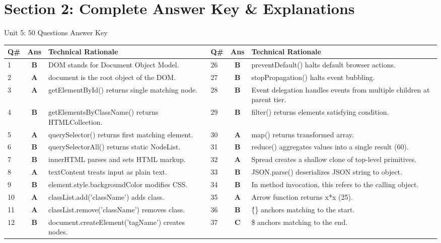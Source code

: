 \newpage
\section{Section 2: Complete Answer Key \& Explanations}

\begin{answerkeytable}{Unit 5: 50 Questions Answer Key}
\begin{tabularx}{\textwidth}{l c X l c X}
\toprule
\textbf{Q\#} & \textbf{Ans} & \textbf{Technical Rationale} & \textbf{Q\#} & \textbf{Ans} & \textbf{Technical Rationale} \\
\midrule
1 & \textbf{B} & DOM stands for Document Object Model. & 26 & \textbf{B} & preventDefault() halts default browser actions. \\
2 & \textbf{A} & document is the root object of the DOM. & 27 & \textbf{B} & stopPropagation() halts event bubbling. \\
3 & \textbf{A} & getElementById() returns single matching node. & 28 & \textbf{B} & Event delegation handles events from multiple children at parent tier. \\
4 & \textbf{B} & getElementsByClassName() returns HTMLCollection. & 29 & \textbf{B} & filter() returns elements satisfying condition. \\
5 & \textbf{A} & querySelector() returns first matching element. & 30 & \textbf{A} & map() returns transformed array. \\
6 & \textbf{B} & querySelectorAll() returns static NodeList. & 31 & \textbf{B} & reduce() aggregates values into a single result (60). \\
7 & \textbf{B} & innerHTML parses and sets HTML markup. & 32 & \textbf{A} & Spread creates a shallow clone of top-level primitives. \\
8 & \textbf{A} & textContent treats input as plain text. & 33 & \textbf{B} & JSON.parse() deserializes JSON string to object. \\
9 & \textbf{B} & element.style.backgroundColor modifies CSS. & 34 & \textbf{B} & In method invocation, this refers to the calling object. \\
10 & \textbf{A} & classList.add('className') adds class. & 35 & \textbf{A} & Arrow function returns x*x (25). \\
11 & \textbf{A} & classList.remove('className') removes class. & 36 & \textbf{B} & \^\{\} anchors matching to the start. \\
12 & \textbf{B} & document.createElement('tagName') creates nodes. & 37 & \textbf{C} & \$ anchors matching to the end. \\

\end{tabularx}
\end{answerkeytable}
